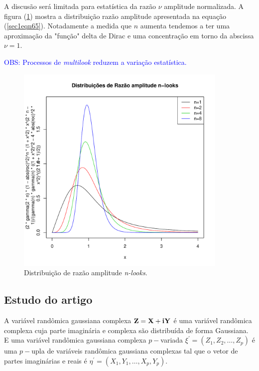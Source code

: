 \documentclass[10pt,a4paper]{article}
\begin{document}
A discusão será limitada para estatística da razão $\nu$ amplitude normalizada. A figura (\ref{sec1fig2}) mostra a distribuição razão amplitude apresentada na equação  (\ref{sec1eqn65}). Notadamente a medida que $n$ aumenta tendemos a ter uma aproximação da "função" delta de Dirac e uma concentração em torno da abscissa $\nu=1$.

\textcolor{blue}{OBS: Processos de {\it multilook} reduzem a variação estatística.}

\begin{figure}[!h]
\centering
\includegraphics[width=4.0in]{fig4_eq_33_lee_1994.pdf}
	\caption{Distribuição de razão amplitude {\it n-looks}.}
\label{sec1fig2}
\end{figure}


\subsection{Estudo do artigo  \cite{goodman1963}}


A variável randômica gaussiana complexa ${\bf Z=X+iY}$ é uma variável randômica complexa cuja parte imaginária e complexa são distribuída de forma Gaussiana.  E uma variável randômica gaussiana complexa $p-$variada $\xi^{'}=(Z_1,Z_2,\dots,Z_p)$ é uma $p-$upla  de variáveis randômica gaussiana complexas tal que o vetor de partes imaginárias e reais é $\eta^{'}=(X_1,Y_1,\dots,X_p,Y_p)$.
\end{document}
